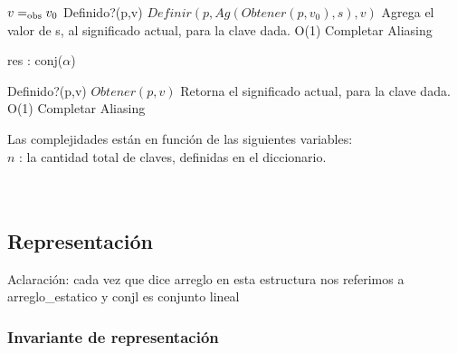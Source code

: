  {$v =_{\mathrm{obs}} v_0$ \land Definido?(p,v)
 {$Definir(p , Ag(Obtener(p,v_0),s) , v)$}
 {Agrega el valor de s, al significado actual, para la clave dada.}
 {O(1)}
 {Completar Aliasing}

 {res : conj($\alpha$)}
 {Definido?(p,v)
 {$Obtener(p,v)$}
 {Retorna el significado actual, para la clave dada.}
 {O(1)}
 {Completar Aliasing}
 
Las complejidades est\'an en funci\'on de las siguientes variables:\\
$n$ : la cantidad total de claves, definidas en el diccionario. \\
\\ \\


\subsection{Representaci\'on}


Aclaraci\'on: cada vez que dice arreglo en esta estructura nos referimos a arreglo\_estatico y conjl es conjunto lineal

\subsubsection*{Invariante de representaci\'on}

}}
